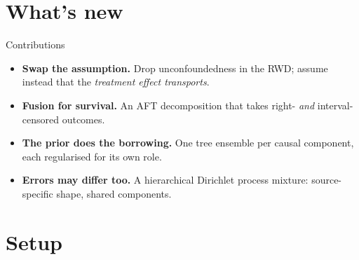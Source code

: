 \documentclass[10pt,aspectratio=169]{beamer}
\begin{document}
\section{What's new}

\begin{frame}{Contributions}
\begin{itemize}
  \item \textbf{Swap the assumption.} Drop unconfoundedness in the RWD;
        assume instead that the \emph{treatment effect transports}.
  \vspace{0.55cm}
  \item \textbf{Fusion for survival.} An AFT decomposition that takes
        right- \emph{and} interval-censored outcomes.
  \vspace{0.55cm}
  \item \textbf{The prior does the borrowing.} One tree ensemble per causal
        component, each regularised for its own role.
  \vspace{0.55cm}
  \item \textbf{Errors may differ too.} A hierarchical Dirichlet process
        mixture: source-specific shape, shared components.
\end{itemize}
\end{frame}

\section{Setup}
\end{document}

